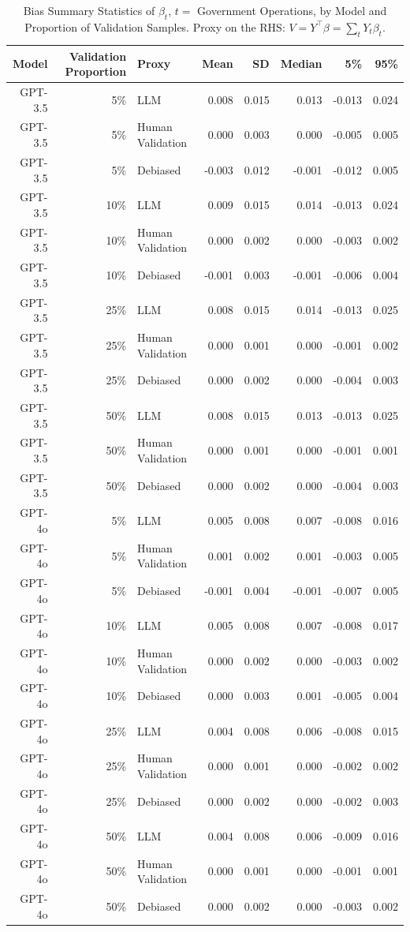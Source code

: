 \begin{table}

\caption{\label{tab:unnamed-chunk-1}Bias Summary Statistics of $\beta_{t}$, $t=$ Government Operations, by Model and Proportion of Validation Samples.
      Proxy on the RHS: $V = Y^\top \beta = \sum_{t} Y_t \beta_t$.}
\centering
\begin{tabular}[t]{rrlrrrrr}
\toprule
Model & Validation Proportion & Proxy & Mean & SD & Median & 5\% & 95\%\\
\midrule
GPT-3.5 & 5\% & LLM & 0.008 & 0.015 & 0.013 & -0.013 & 0.024\\
GPT-3.5 & 5\% & Human Validation & 0.000 & 0.003 & 0.000 & -0.005 & 0.005\\
GPT-3.5 & 5\% & Debiased & -0.003 & 0.012 & -0.001 & -0.012 & 0.005\\
GPT-3.5 & 10\% & LLM & 0.009 & 0.015 & 0.014 & -0.013 & 0.024\\
GPT-3.5 & 10\% & Human Validation & 0.000 & 0.002 & 0.000 & -0.003 & 0.002\\
GPT-3.5 & 10\% & Debiased & -0.001 & 0.003 & -0.001 & -0.006 & 0.004\\
GPT-3.5 & 25\% & LLM & 0.008 & 0.015 & 0.014 & -0.013 & 0.025\\
GPT-3.5 & 25\% & Human Validation & 0.000 & 0.001 & 0.000 & -0.001 & 0.002\\
GPT-3.5 & 25\% & Debiased & 0.000 & 0.002 & 0.000 & -0.004 & 0.003\\
GPT-3.5 & 50\% & LLM & 0.008 & 0.015 & 0.013 & -0.013 & 0.025\\
GPT-3.5 & 50\% & Human Validation & 0.000 & 0.001 & 0.000 & -0.001 & 0.001\\
GPT-3.5 & 50\% & Debiased & 0.000 & 0.002 & 0.000 & -0.004 & 0.003\\
GPT-4o & 5\% & LLM & 0.005 & 0.008 & 0.007 & -0.008 & 0.016\\
GPT-4o & 5\% & Human Validation & 0.001 & 0.002 & 0.001 & -0.003 & 0.005\\
GPT-4o & 5\% & Debiased & -0.001 & 0.004 & -0.001 & -0.007 & 0.005\\
GPT-4o & 10\% & LLM & 0.005 & 0.008 & 0.007 & -0.008 & 0.017\\
GPT-4o & 10\% & Human Validation & 0.000 & 0.002 & 0.000 & -0.003 & 0.002\\
GPT-4o & 10\% & Debiased & 0.000 & 0.003 & 0.001 & -0.005 & 0.004\\
GPT-4o & 25\% & LLM & 0.004 & 0.008 & 0.006 & -0.008 & 0.015\\
GPT-4o & 25\% & Human Validation & 0.000 & 0.001 & 0.000 & -0.002 & 0.002\\
GPT-4o & 25\% & Debiased & 0.000 & 0.002 & 0.000 & -0.002 & 0.003\\
GPT-4o & 50\% & LLM & 0.004 & 0.008 & 0.006 & -0.009 & 0.016\\
GPT-4o & 50\% & Human Validation & 0.000 & 0.001 & 0.000 & -0.001 & 0.001\\
GPT-4o & 50\% & Debiased & 0.000 & 0.002 & 0.000 & -0.003 & 0.002\\
\bottomrule
\end{tabular}
\end{table}
